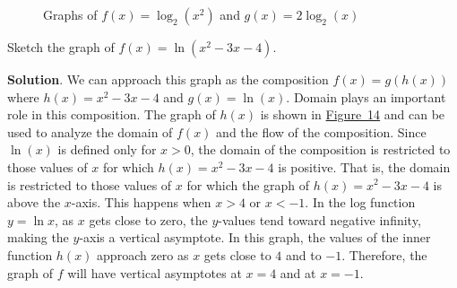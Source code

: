 \documentclass[10pt,]{book}
\theoremstyle{ptxdefinitionnotitle}
\theoremstyle{ptxdefinitiontitle}
\theoremstyle{ptxdefinitionnotitle}
\theoremstyle{ptxdefinitiontitle}
\theoremstyle{ptxdefinitionnotitle}
\theoremstyle{ptxdefinitiontitle}
\numberwithin{equation}{section}
\newcommand{\lt}{<}
\newcommand{\gt}{>}
\begin{document}
\begin{example}
\begin{figure}
\begin{sidebyside}{2}{0}{0}{0}
\begin{sbspanel}{0.5}
{{
}
}
\end{sbspanel}
\end{sidebyside}
\caption{Graphs of \(f(x) = \log_2 \left( x^2 \right)\) and \(g(x) = 2 \log_2 \left( x \right)\)\label{logs-not-equal}}
\end{figure}
\end{example}
\begin{example}\label{example-28}
\hypertarget{p-353}{}%
Sketch the graph of \(f(x) = \ln \left( x^2 - 3x - 4 \right)\).%
\par\smallskip%
\noindent\textbf{Solution}.\hypertarget{solution-28}{}\quad%
\hypertarget{p-354}{}%
We can approach this graph as the composition \(f(x) = g \left( h(x) \right)\) where \(h(x) = x^2 - 3x - 4\) and \(g(x) = \ln (x)\).  Domain plays an important role in this composition. The graph of \(h(x)\) is shown in \hyperref[log-composition-just-quad]{Figure~14} and can be used to analyze the domain of \(f(x)\) and the flow of the composition. Since \(\ln (x)\) is defined only for \(x \gt 0\), the domain of the composition is restricted to those values of \(x\) for which \(h(x) = x^2 -3x - 4\) is positive. That is, the domain is restricted to those values of \(x\) for which the graph of \(h(x) = x^2 -3x -4\) is above the \(x\)-axis. This happens when \(x \gt 4\) or \(x \lt -1\). In the log function \(y = \ln x\), as \(x\) gets close to zero, the \(y\)-values tend toward negative infinity, making the \(y\)-axis a vertical asymptote.  In this graph, the values of the inner function \(h(x)\) approach zero as \(x\) gets close to \(4\) and to \(-1\).  Therefore, the graph of \(f\) will have vertical asymptotes at \(x = 4\) and at \(x = -1\).%
\begin{figure}
\centering
{
}
\end{figure}
\end{example}
\end{document}
